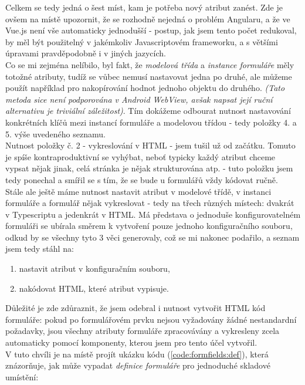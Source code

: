 Celkem se tedy jedná o šest míst, kam je potřeba nový atribut zanést. Zde je ovšem na místě upozornit, že se rozhodně nejedná o problém Angularu, a že ve Vue.js není vše automaticky jednodušší - postup, jak jsem tento počet redukoval, by měl být použitelný v jakémkoliv Javascriptovém frameworku, a s většími úpravami pravděpodobně i v jiných jazycích.\\
Co se mi zejména nelíbilo, byl fakt, že \emph{modelová třída} a \emph{instance formuláře} měly totožné atributy, tudíž se vůbec nemusí nastavovat jedna po druhé, ale můžeme použít například  \cite{mdn-object-assign} pro nakopírování hodnot jednoho objektu do druhého. \emph{(Tato metoda sice není podporována v Android WebView, avšak napsat její ruční alternativu je triviální záležitost)}. Tím dokážeme odbourat nutnost nastavování konkrétních klíčů mezi instancí formuláře a modelovou třídou - tedy položky 4. a 5. výše uvedeného seznamu.\\
Nutnost položky č. 2 - vykreslování v HTML - jsem tušil už od začátku. Tomuto je spíše kontraproduktivní se vyhýbat, neboť typicky každý atribut chceme vypsat nějak jinak, celá stránka je nějak strukturována atp. - tuto položku jsem tedy ponechal a smířil se s tím, že se bude u formulářů vždy kódovat ručně.\\
Stále ale ještě máme nutnost nastavit atribut v modelové třídě, v instanci formuláře a formulář nějak vykreslovat - tedy na třech různých místech: dvakrát v Typescriptu a jedenkrát v HTML. Má představa o jednoduše konfigurovatelném formuláři se ubírala směrem k vytvoření pouze jednoho konfiguračního souboru, odkud by se všechny tyto 3 věci generovaly, což se mi nakonec podařilo, a seznam jsem tedy stáhl na:

\begin{enumerate}
    \item nastavit atribut v konfiguračním souboru,
    \item nakódovat HTML, které atribut vypisuje.
\end{enumerate}

Důležité je zde zdůraznit, že jsem odebral i nutnost vytvořit HTML kód formuláře: pokud po formulářovém prvku nejsou vyžadovány žádné nestandardní požadavky, jsou všechny atributy formuláře zpracovávány a vykresleny zcela automaticky pomocí komponenty, kterou jsem pro tento účel vytvořil.\\
V tuto chvíli je na místě projít ukázku kódu (\ref{code:formfields:def}), která znázorňuje, jak může vypadat \emph{definice formuláře} pro jednoduché skladové umístění:

